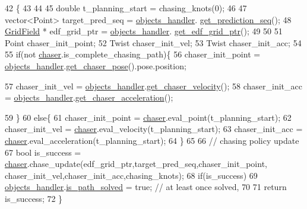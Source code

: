 \begin{DoxyCode}
42                                                      \{
43     
44     
45     \textcolor{keywordtype}{double} t\_planning\_start = chasing\_knots(0);
46 
47     vector<Point>  target\_pred\_seq = \hyperlink{class_wrapper_a8cddd5ffbaeb5ab0b5d8d8d0c74f810f}{objects\_handler}.
      \hyperlink{class_objects_handler_a4793f1ed257c849b28f0386f635ee714}{get\_prediction\_seq}();
48     \hyperlink{struct_grid_field}{GridField} * edf\_grid\_ptr = \hyperlink{class_wrapper_a8cddd5ffbaeb5ab0b5d8d8d0c74f810f}{objects\_handler}.
      \hyperlink{class_objects_handler_afe849882d1feeef8316a45632381da54}{get\_edf\_grid\_ptr}();
49     
50 
51     Point chaser\_init\_point;
52     Twist chaser\_init\_vel; 
53     Twist chaser\_init\_acc;
54 
55     \textcolor{keywordflow}{if}(not \hyperlink{namespacechaser}{chaser}.is\_complete\_chasing\_path)\{    
56         chaser\_init\_point = \hyperlink{class_wrapper_a8cddd5ffbaeb5ab0b5d8d8d0c74f810f}{objects\_handler}.\hyperlink{class_objects_handler_a4ac7a7bb712575c2ff6ffbf37144cf56}{get\_chaser\_pose}().pose.position; 
         
57         chaser\_init\_vel = \hyperlink{class_wrapper_a8cddd5ffbaeb5ab0b5d8d8d0c74f810f}{objects\_handler}.\hyperlink{class_objects_handler_aa1af309b0e964ccb6df8dede045fa32b}{get\_chaser\_velocity}();
58         chaser\_init\_acc = \hyperlink{class_wrapper_a8cddd5ffbaeb5ab0b5d8d8d0c74f810f}{objects\_handler}.\hyperlink{class_objects_handler_a41d48832b07a4d4276147a99dd1d31bc}{get\_chaser\_acceleration}(); 
        
59     \}
60     \textcolor{keywordflow}{else}\{
61         chaser\_init\_point = \hyperlink{namespacechaser}{chaser}.eval\_point(t\_planning\_start);
62         chaser\_init\_vel = \hyperlink{namespacechaser}{chaser}.eval\_velocity(t\_planning\_start);
63         chaser\_init\_acc = \hyperlink{namespacechaser}{chaser}.eval\_acceleration(t\_planning\_start);
64     \}
65 
66     \textcolor{comment}{// chasing policy update }
67     \textcolor{keywordtype}{bool} is\_success = \hyperlink{namespacechaser}{chaser}.chase\_update(edf\_grid\_ptr,target\_pred\_seq,chaser\_init\_point,
      chaser\_init\_vel,chaser\_init\_acc,chasing\_knots);   
68     \textcolor{keywordflow}{if}(is\_success) 
69         \hyperlink{class_wrapper_a8cddd5ffbaeb5ab0b5d8d8d0c74f810f}{objects\_handler}.\hyperlink{class_objects_handler_ad8d1ea6646024f0a03e154a7c2c07682}{is\_path\_solved} = \textcolor{keyword}{true}; \textcolor{comment}{// at least once solved, }
70 
71     \textcolor{keywordflow}{return} is\_success;
72 \}
\end{DoxyCode}
